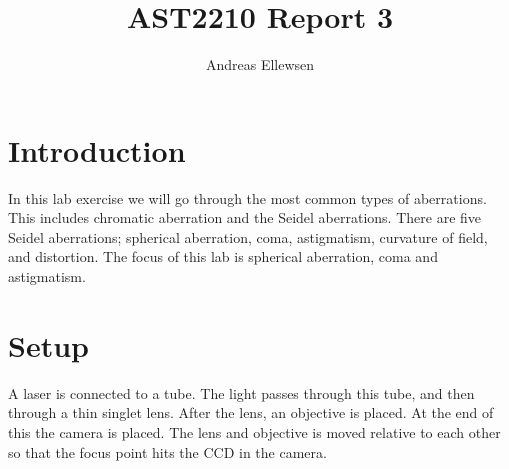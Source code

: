 \documentclass[a4paper,12pt]{article}
\title{AST2210 Report 3}
\author{Andreas Ellewsen}
\begin{document}
\maketitle
\section{Introduction}
In this lab exercise we will go through the most common types of aberrations. This includes chromatic aberration and the Seidel aberrations. There are five Seidel aberrations; spherical aberration, coma, astigmatism, curvature of field, and distortion. The focus of this lab is spherical aberration, coma and astigmatism.
\section{Setup}
A laser is connected to a tube. The light passes through this tube, and then through a thin singlet lens. After the lens, an objective is placed. At the end of this the camera is placed. The lens and objective is moved relative to each other so that the focus point hits the CCD in the camera.
\end{document}
